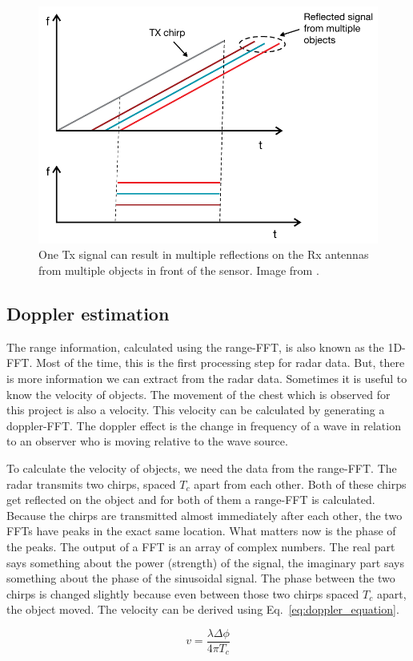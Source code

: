 \begin{figure}[t]
\centering
\includegraphics[width=.5\textwidth]{figures/background/reflected_signals.png}
\caption{One Tx signal can result in multiple reflections on the Rx antennas from multiple objects in front of the sensor. Image from \cite{mmwave_fundamentals_website}.}
\label{fig:if_multiple}
\end{figure}

\subsection{Doppler estimation}
The range information, calculated using the range-FFT, is also known as the 1D-FFT. Most of the time, this is the first processing step for radar data. But, there is more information we can extract from the radar data. Sometimes it is useful to know the velocity of objects. The movement of the chest which is observed for this project is also a velocity. This velocity can be calculated by generating a doppler-FFT. The doppler effect is the change in frequency of a wave in relation to an observer who is moving relative to the wave source.

To calculate the velocity of objects, we need the data from the range-FFT. The radar transmits two chirps, spaced $T_c$ apart from each other. Both of these chirps get reflected on the object and for both of them a range-FFT is calculated. Because the chirps are transmitted almost immediately after each other, the two FFTs have peaks in the exact same location. What matters now is the phase of the peaks. The output of a FFT is an array of complex numbers. The real part says something about the power (strength) of the signal, the imaginary part says something about the phase of the sinusoidal signal. The phase between the two chirps is changed slightly because even between those two chirps spaced $T_c$ apart, the object moved. The velocity can be derived using Eq.~\ref{eq:doppler_equation}.

\begin{equation}
v = \frac{\lambda \Delta \phi}{4 \pi T_c}
\label{eq:doppler_equation}
\end{equation}

